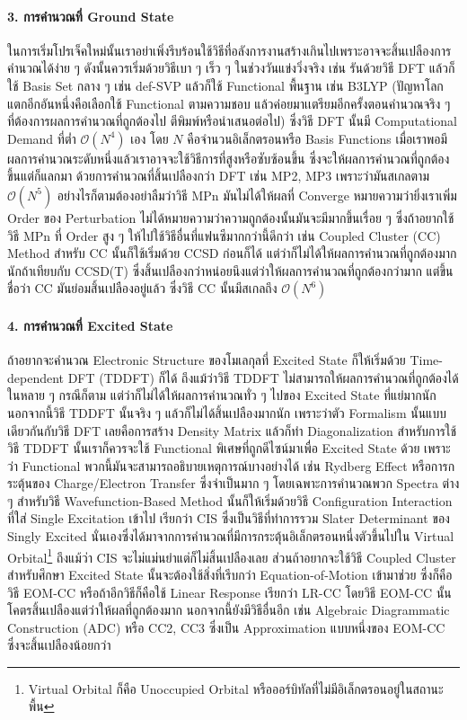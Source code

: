 \paragraph{3. การคำนวณที่ Ground State}
ในการเริ่มโปรเจ็คใหม่นั้นเราอย่าเพิ่งรีบร้อนใช้วิธีที่อลังการงานสร้างเกินไปเพราะอาจจะสิ้นเปลืองการคำนวณได้ง่าย ๆ ดังนั้นควรเริ่มด้วยวิธีเบา ๆ เร็ว ๆ
ในช่วงวันแข่งวิ่งจริง เช่น รันด้วยวิธี DFT แล้วก็ใช้ Basis Set กลาง ๆ เช่น def-SVP แล้วก็ใช้ Functional พื้นฐาน เช่น B3LYP
(ปัญหาโลกแตกอีกอันหนึ่งคือเลือกใช้ Functional ตามความชอบ แล้วค่อยมาเเตรียมอีกครั้งตอนคำนวณจริง ๆ ที่ต้องการผลการคำนวณที่ถูกต้องไป%
ตีพิมพ์หรือนำเสนอต่อไป) ซึ่งวิธี DFT นั้นมี Computational Demand ที่ต่ำ $\mathcal{O}(N^{4})$ เอง โดย $N$ คือจำนวนอิเล็กตรอนหรือ
Basis Functions เมื่อเราพอมีผลการคำนวณระดับหนึ่งแล้วเราอาจจะใช้วิธีการที่สูงหรือซับซ้อนขึ้น ซึ่งจะให้ผลการคำนวณที่ถูกต้องขึ้นแต่ก็แลกมา%
ด้วยการคำนวณที่สิ้นเปลืองกว่า DFT เช่น MP2, MP3 เพราะว่ามันสเกลตาม $\mathcal{O}(N^{5})$ อย่างไรก็ตามต้องอย่าลืมว่าวิธี MPn
มันไม่ได้ให้ผลที่ Converge หมายความว่ายิ่งเราเพิ่ม Order ของ Perturbation ไม่ได้หมายความว่าความถูกต้องนั้นมันจะมีมากขึ้นเรื่อย ๆ
ซึ่งถ้าอยากใช้วิธี MPn ที่ Order สูง ๆ ให้ไปใช้วิธีอื่นที่แฟนซีมากกว่านี้ดีกว่า เช่น Coupled Cluster (CC) Method สำหรับ CC นั้นก็ใช้เริ่มด้วย
CCSD ก่อนก็ได้ แต่ว่าก็ไม่ได้ให้ผลการคำนวณที่ถูกต้องมากนักถ้าเทียบกับ CCSD(T) ซึ่งสิ้นเปลืองกว่าหน่อยนึงแต่ว่าให้ผลการคำนวณที่ถูกต้องกว่ามาก
แต่ขึ้นชื่อว่า CC มันย่อมสิ้นเปลืองอยู่แล้ว ซึ่งวิธี CC นั้นมีสเกลถึง $\mathcal{O}(N^{6})$

\paragraph{4. การคำนวณที่ Excited State}
ถ้าอยากจะคำนวณ Electronic Structure ของโมเลกุลที่ Excited State ก็ให้เริ่มด้วย Time-dependent DFT (TDDFT) ก็ได้ ถึงแม้ว่าวิธี
TDDFT ไม่สามารถให้ผลการคำนวณที่ถูกต้องได้ในหลาย ๆ กรณีก็ตาม แต่ว่าก็ไม่ได้ให้ผลการคำนวณทั่ว ๆ ไปของ Excited State ที่แย่มากนัก
นอกจากนี้วิธี TDDFT นั้นจริง ๆ แล้วก็ไม่ได้สิ้นเปลืองมากนัก เพราะว่าตัว Formalism นั้นแบบเดียวกันกับวิธี DFT เลยคือการสร้าง Density Matrix
แล้วก็ทำ Diagonalization สำหรับการใช้วิธี TDDFT นั้นเราก็ควรจะใช้ Functional พิเศษที่ถูกดีไซน์มาเพื่อ Excited State ด้วย เพราะว่า
Functional พวกนี้มันจะสามารถอธิบายเหตุการณ์บางอย่างได้ เช่น Rydberg Effect หรือการกระตุ้นของ Charge/Electron Transfer
ซึ่งจำเป็นมาก ๆ โดยเฉพาะการคำนวณพวก Spectra ต่าง ๆ สำหรับวิธี Wavefunction-Based Method นั้นก็ให้เริ่มด้วยวิธี Configuration
Interaction ที่ใส่ Single Excitation เข้าไป เรียกว่า CIS ซึ่งเป็นวิธีที่ทำการรวม Slater Determinant ของ Singly Excited
นั่นเองซึ่งได้มาจากการคำนวณที่มีการกระตุ้นอิเล็กตรอนหนึ่งตัวขึ้นไปใน Virtual Orbital\footnote{Virtual Orbital ก็คือ Unoccupied
  Orbital หรือออร์บิทัลที่ไม่มีอิเล็กตรอนอยู่ในสถานะพื้น} ถึงแม้ว่า CIS จะไม่แม่นยำแต่ก็ไม่สิ้นเปลืองเลย ส่วนถ้าอยากจะใช้วิธี Coupled Cluster
สำหรับศึกษา Excited State นั้นจะต้องใช้สิ่งที่เรีบกว่า Equation-of-Motion เข้ามาช่วย ซึ่งก็คือวิธี EOM-CC หรือถ้าอีกวิธีก็คือใช้ Linear
Response เรียกว่า LR-CC โดยวิธี EOM-CC นั้นโคตรสิ้นเปลืองแต่ว่าให้ผลที่ถูกต้องมาก นอกจากนี้ยังมีวิธีอื่นอีก เช่น Algebraic Diagrammatic
Construction (ADC) หรือ CC2, CC3 ซึ่งเป็น Approximation แบบหนึ่งของ EOM-CC ซึ่งจะสิ้นเปลืองน้อยกว่า

